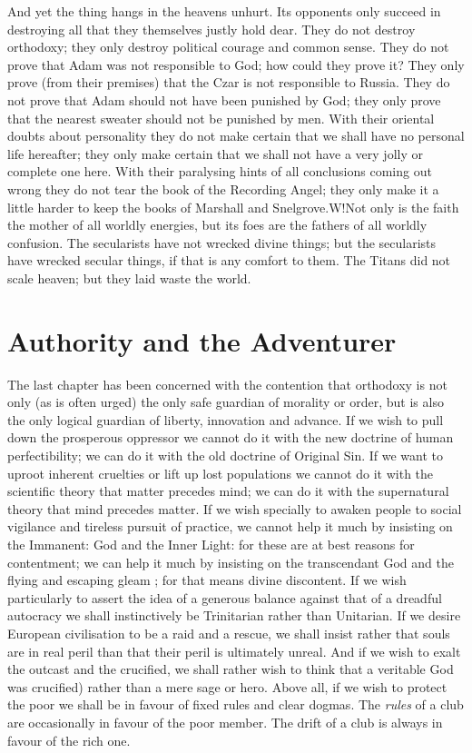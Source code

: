 \documentclass{book}
\begin{document}
And yet the thing hangs in the heavens unhurt. Its opponents only succeed in destroying all that they themselves justly hold dear. They do not destroy orthodoxy; they only destroy political courage and common sense. They do not prove that Adam was not responsible to God; how could they prove it? They only prove (from their premises) that the Czar is not responsible to Russia. They do not prove that Adam should not have been punished by God; they only prove that the nearest sweater should not be punished by men. With their oriental doubts about personality they do not make certain that we shall have no personal life hereafter; they only make certain that we shall not have a very jolly or complete one here. With their paralysing hints of all conclusions coming out wrong they do not tear the book of the Recording Angel; they only make it a little harder to keep the books of Marshall and Snelgrove.W!Not only is the faith the mother of all worldly energies, but its foes are the fathers of all worldly confusion. The secularists have not wrecked divine things; but the secularists have wrecked secular things, if that is any comfort to them. The Titans did not scale heaven; but they laid waste the world.

\chapter{Authority and the Adventurer}
\label{chapter-8}
The last chapter has been concerned with the contention that orthodoxy is not only (as is often urged) the only safe guardian of morality or order, but is also the only logical guardian of liberty, innovation and advance. If we wish to pull down the prosperous oppressor we cannot do it with the new doctrine of human perfectibility; we can do it with the old doctrine of Original Sin. If we want to uproot inherent cruelties or lift up lost populations we cannot do it with the scientific theory that matter precedes mind; we can do it with the supernatural theory that mind precedes matter. If we wish specially to awaken people to social vigilance and tireless pursuit of practice, we cannot help it much by insisting on the Immanent: God and the Inner Light: for these are at best reasons for contentment; we can help it much by insisting on the transcendant God and the flying and escaping gleam ; for that means divine discontent. If we wish particularly to assert the idea of a generous balance against that of a dreadful autocracy we shall instinctively be Trinitarian rather than Unitarian. If we desire European civilisation to be a raid and a rescue, we shall insist rather that souls are in real peril than that their peril is ultimately unreal. And if we wish to exalt the outcast and the crucified, we shall rather wish to think that a veritable God was crucified) rather than a mere sage or hero. Above all, if we wish to protect the poor we shall be in favour of fixed rules and clear dogmas. The \emph{rules} of a club are occasionally in favour of the poor member. The drift of a club is always in favour of the rich one.
\end{document}
